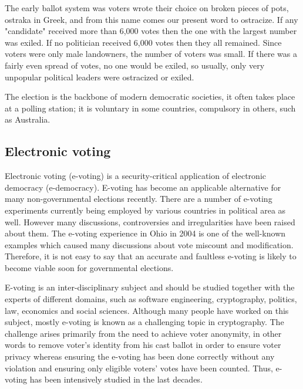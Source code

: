 The early ballot system was voters wrote their choice on broken pieces of pots, ostraka in Greek, and from this name comes our present word to ostracize. If any "candidate" received more than 6,000 votes then the one with the largest number was exiled. If no politician received 6,000 votes then they all remained. Since voters were only male landowners, the number of voters was small. If there was a fairly even spread of votes, no one would be exiled, so usually, only very unpopular political leaders were ostracized or exiled.\cite{mikehoganHistoryElectionsOnline}

The election is the backbone of modern democratic societies, it often takes place at a polling station; it is voluntary in some countries, compulsory in others, such as Australia.

\subsection{Electronic voting}

Electronic voting (e-voting) is a security-critical application of electronic democracy (e-democracy). E-voting has become an applicable alternative for many non-governmental elections recently. There are a number of e-voting experiments currently being employed by various countries in political area as well. However many discussions, controversies and irregularities have been raised about them. The e-voting experience in Ohio in 2004 is one of the well-known examples which caused many discussions about vote miscount and modification. Therefore, it is not easy to say that an accurate and faultless e-voting is likely to become viable soon for governmental elections\cite{orhancetinkayaVerificationValidationIssues}.

E-voting is an inter-disciplinary subject and should be studied together with the experts of different domains, such as software engineering, cryptography, politics, law, economics and social sciences. Although many people have worked on this subject, mostly e-voting is known as a challenging topic in cryptography. The challenge arises primarily from the need to achieve voter anonymity, in other words to remove voter’s identity from his cast ballot in order to ensure voter privacy whereas ensuring the e-voting has been done correctly without any violation and ensuring only eligible voters’ votes have been counted. Thus, e-voting has been intensively studied in the last decades\cite{orhancetinkayaVerificationValidationIssues}.

